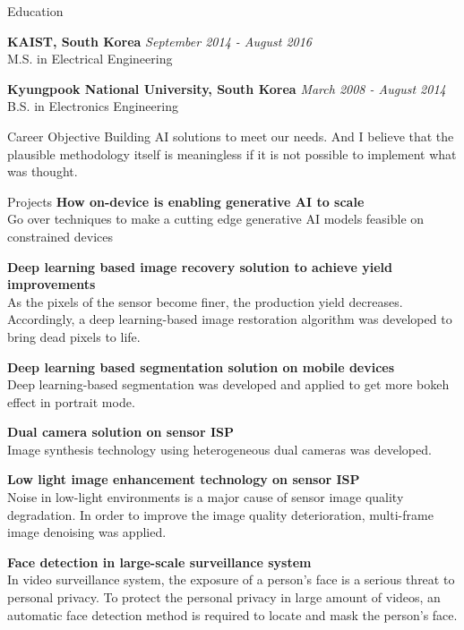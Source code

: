 \documentclass{resume}
\begin{document}
\begin{rSection}{Education}

{\bf KAIST, South Korea} \hfill {\em September 2014 - August 2016} 
\\ M.S. in Electrical Engineering\hfill

{\bf Kyungpook National University, South Korea} \hfill {\em March 2008 - August 2014} 
\\ B.S. in Electronics Engineering\hfill 

\end{rSection}

\begin{rSection}{Career Objective}
 Building AI solutions to meet our needs.
 And I believe that the plausible methodology itself is meaningless if it is not possible to implement what was thought.
\end{rSection}

\begin{rSection}{Projects}
{\bf How on-device is enabling generative AI to scale}
\\ Go over techniques to make a cutting edge generative AI models feasible on constrained devices

{\bf Deep learning based image recovery solution to achieve yield improvements}
\\ As the pixels of the sensor become finer, the production yield decreases. Accordingly, a deep learning-based image restoration algorithm was developed to bring dead pixels to life.

{\bf Deep learning based segmentation solution on mobile devices}
\\ Deep learning-based segmentation was developed and applied to get more bokeh effect in portrait mode.

{\bf Dual camera solution on sensor ISP}
\\ Image synthesis technology using heterogeneous dual cameras was developed.

{\bf Low light image enhancement technology on sensor ISP}
\\ Noise in low-light environments is a major cause of sensor image quality degradation. In order to improve the image quality deterioration, multi-frame image denoising was applied.

{\bf Face detection in large-scale surveillance system }
\\ In video surveillance system, the exposure of a person’s face is a serious threat to personal privacy.
To protect the personal privacy in large amount of videos, an automatic face detection method is required to locate and mask the person’s face.

\end{rSection}
\end{document}

